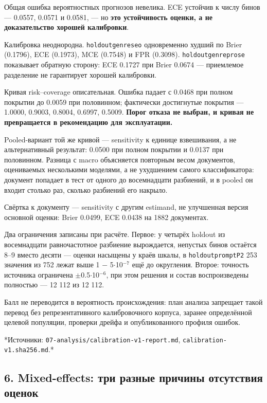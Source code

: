 \documentclass[11pt,a4paper]{article}
\renewcommand{\_}{\textunderscore\allowbreak}
\begin{document}
Общая ошибка вероятностных прогнозов невелика. ECE устойчив к числу бинов —
0.0557, 0.0571 и 0.0581, — но \textbf{это устойчивость оценки, а не доказательство
хорошей калибровки}.

Калибровка неоднородна. \texttt{holdout\_genre\_seo} одновременно худший по Brier
(0.1796), ECE (0.1973), MCE (0.7548) и FPR (0.3098). \texttt{holdout\_genre\_prose}
показывает обратную сторону: ECE 0.1727 при Brier 0.0674 — приемлемое разделение
не гарантирует хорошей калибровки.

Кривая risk–coverage описательная. Ошибка падает с 0.0468 при полном покрытии до
0.0059 при половинном; фактически достигнутые покрытия — 1.0000, 0.9003, 0.8004,
0.6997, 0.5009. \textbf{Порог отказа не выбран, и кривая не превращается в рекомендацию
для эксплуатации.}

Pooled-вариант той же кривой — sensitivity к единице взвешивания, а не
альтернативный результат: 0.0500 при полном покрытии и 0.0137 при половинном.
Разница с macro объясняется повторным весом документов, оцениваемых несколькими
моделями, а не ухудшением самого классификатора: документ попадает в тест от
одного до восемнадцати разбиений, и в pooled он входит столько раз, сколько
разбиений его накрыло.

Свёртка к документу — sensitivity с другим estimand, не улучшенная версия
основной оценки: Brier 0.0499, ECE 0.0438 на 1882 документах.

Два ограничения записаны при расчёте. Первое: у четырёх holdout из восемнадцати
равночастотное разбиение вырождается, непустых бинов остаётся 8–9 вместо десяти —
оценки насыщены у краёв шкалы, в \texttt{holdout\_prompt\_P2} 253 значения из 752 лежат
выше 1 $-$ 5$\cdot$10$^{-7}$ ещё до округления. Второе: точность источника ограничена
$\pm$0.5$\cdot$10$^{-6}$, при этом решения и состав воспроизведены полностью — 12 112 из 12 112.

Балл не переводится в вероятность происхождения: план анализа запрещает такой
перевод без репрезентативного калибровочного корпуса, заранее определённой
целевой популяции, проверки дрейфа и опубликованного профиля ошибок.

*Источники: \texttt{07-\allowbreak{}analysis/calibration-\allowbreak{}v1-\allowbreak{}report.md}, \texttt{calibration-\allowbreak{}v1.sha256.md}.*

\subsection{6. Mixed-effects: три разные причины отсутствия оценок}
\end{document}
